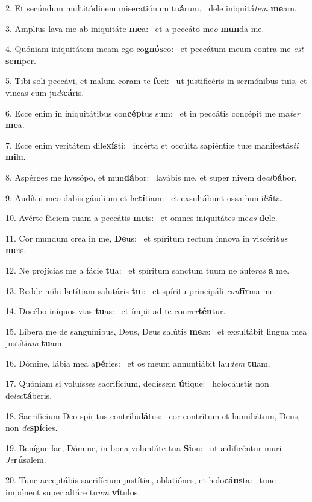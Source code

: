 2. Et secúndum multitúdinem miseratiónum tu\textbf{á}rum, \ast\  dele iniquitá\textit{tem} \textbf{me}am.\

3. Amplius lava me ab iniquitáte \textbf{me}a: \ast\  et a peccáto me\textit{o} \textbf{mun}da me.\

4. Quóniam iniquitátem meam ego co\textbf{gnós}co: \ast\  et peccátum meum contra me \textit{est} \textbf{sem}per.\

5. Tibi soli peccávi, et malum coram te \textbf{fe}ci: \ast\  ut justificéris in sermónibus tuis, et vincas cum ju\textit{di}\textbf{cá}ris.\

6. Ecce enim in iniquitátibus con\textbf{cép}tus sum: \ast\  et in peccátis concépit me ma\textit{ter} \textbf{me}a.\

7. Ecce enim veritátem dile\textbf{xís}ti: \ast\  incérta et occúlta sapiéntiæ tuæ manifestás\textit{ti} \textbf{mi}hi.\

8. Aspérges me hyssópo, et mun\textbf{dá}bor: \ast\  lavábis me, et super nivem de\textit{al}\textbf{bá}bor.\

9. Audítui meo dabis gáudium et læ\textbf{tí}tiam: \ast\  et exsultábunt ossa humi\textit{li}\textbf{á}ta.\

10. Avérte fáciem tuam a peccátis \textbf{me}is: \ast\  et omnes iniquitátes me\textit{as} \textbf{de}le.\

11. Cor mundum crea in me, \textbf{De}us: \ast\  et spíritum rectum ínnova in viscéri\textit{bus} \textbf{me}is.\

12. Ne projícias me a fácie \textbf{tu}a: \ast\  et spíritum sanctum tuum ne áufe\textit{ras} \textbf{a} me.\

13. Redde mihi lætítiam salutáris \textbf{tu}i: \ast\  et spíritu principáli \textit{con}\textbf{fír}ma me.\

14. Docébo iníquos vias \textbf{tu}as: \ast\  et ímpii ad te con\textit{ver}\textbf{tén}tur.\

15. Líbera me de sanguínibus, Deus, Deus salútis \textbf{me}æ: \ast\  et exsultábit lingua mea justíti\textit{am} \textbf{tu}am.\

16. Dómine, lábia mea a\textbf{pé}ries: \ast\  et os meum annuntiábit lau\textit{dem} \textbf{tu}am.\

17. Quóniam si voluísses sacrifícium, dedíssem \textbf{ú}tique: \ast\  holocáustis non de\textit{lec}\textbf{tá}beris.\

18. Sacrifícium Deo spíritus contribu\textbf{lá}tus: \ast\  cor contrítum et humiliátum, Deus, non \textit{de}\textbf{spí}cies.\

19. Benígne fac, Dómine, in bona voluntáte tua \textbf{Si}on: \ast\  ut ædificéntur muri \textit{Je}\textbf{rú}salem.\

20. Tunc acceptábis sacrifícium justítiæ, oblatiónes, et holo\textbf{cáus}ta: \ast\  tunc impónent super altáre tu\textit{um} \textbf{ví}tulos.\


